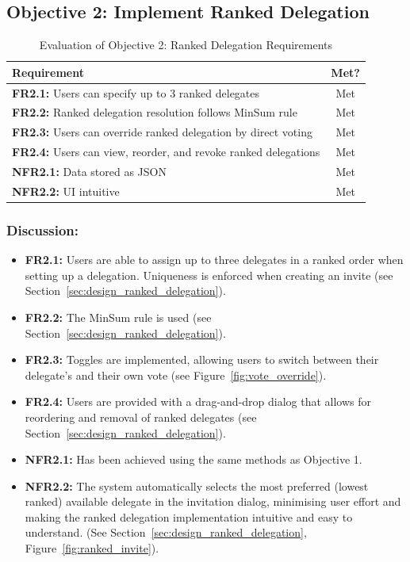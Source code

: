 \subsection{Objective 2: Implement Ranked Delegation}

\begin{table}[H]
\centering
\begin{tabular}{|p{9cm}|c|}
\hline
\textbf{Requirement} & \textbf{Met?} \\ \hline
\textbf{FR2.1:} Users can specify up to 3 ranked delegates & Met \\ \hline
\textbf{FR2.2:} Ranked delegation resolution follows MinSum rule & Met \\ \hline
\textbf{FR2.3:} Users can override ranked delegation by direct voting & Met \\ \hline
\textbf{FR2.4:} Users can view, reorder, and revoke ranked delegations & Met \\ \hline
\textbf{NFR2.1:} Data stored as JSON & Met \\ \hline
\textbf{NFR2.2:} UI intuitive & Met \\ \hline
\end{tabular}
\caption{Evaluation of Objective 2: Ranked Delegation Requirements}
\label{tab:objective2_requirements}
\end{table}

\subsubsection{Discussion:}

\begin{itemize}
    \item \textbf{FR2.1:} Users are able to assign up to three delegates in a ranked order when setting up a delegation. Uniqueness is enforced when creating an invite (see Section~\ref{sec:design_ranked_delegation}).
    \item \textbf{FR2.2:} The MinSum rule is used (see Section~\ref{sec:design_ranked_delegation}).
    \item \textbf{FR2.3:} Toggles are implemented, allowing users to switch between their delegate's and their own vote (see Figure~\ref{fig:vote_override}).
    \item \textbf{FR2.4:} Users are provided with a drag-and-drop dialog that allows for reordering and removal of ranked delegates (see Section~\ref{sec:design_ranked_delegation}).
    \item \textbf{NFR2.1:} Has been achieved using the same methods as Objective 1.
    \item \textbf{NFR2.2:} The system automatically selects the most preferred (lowest ranked) available delegate in the invitation dialog, minimising user effort and making the ranked delegation implementation intuitive and easy to understand. (See Section~\ref{sec:design_ranked_delegation}, Figure~\ref{fig:ranked_invite}).
\end{itemize}


